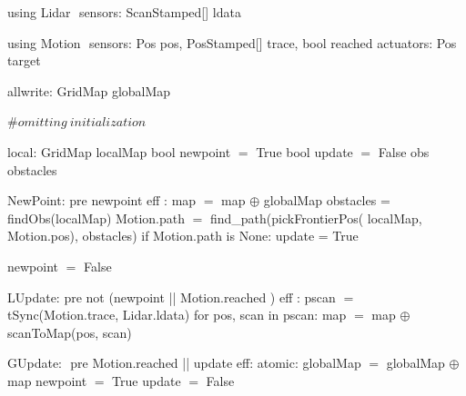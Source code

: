 using Lidar $\label{lidardef}$
    sensors:
       ScanStamped[] ldata

using Motion $\label{moddef}$
    sensors:
        Pos pos,
        PosStamped[] trace,
        bool reached
    actuators:
        Pos target

allwrite:$\label{awvar}$
    GridMap globalMap

#$\mathit{omitting\ initialization}$

local:
   GridMap localMap
   bool newpoint $=$ True
   bool update  $=$ False
   obs obstacles

NewPoint:$\label{newpt}$
  pre newpoint
  eff : map $=$ map $\oplus$ globalMap
        obstacles = findObs(localMap)
        Motion.path $=$ find_path(pickFrontierPos(
                              localMap, Motion.pos), obstacles)
        if Motion.path is None:
           update = True

        newpoint $=$ False

LUpdate:$\label{lup}$
   pre not (newpoint || Motion.reached )
   eff : pscan $=$ tSync(Motion.trace, Lidar.ldata)
         for pos, scan in pscan:
             map $=$ map $\oplus$ scanToMap(pos, scan)

GUpdate: $\label{gup}$
  pre Motion.reached || update
  eff: atomic:
           globalMap $=$ globalMap $\oplus$ map
        newpoint $=$ True
        update $=$ False
